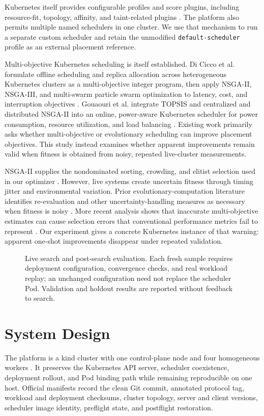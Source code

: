 \documentclass[conference]{IEEEtran}
\begin{document}
Kubernetes itself provides configurable profiles and score plugins, including resource-fit, topology, affinity, and taint-related plugins \cite{ref-k8s-config}. The platform also permits multiple named schedulers in one cluster. We use that mechanism to run a separate custom scheduler and retain the unmodified \texttt{default-scheduler} profile as an external placement reference.

Multi-objective Kubernetes scheduling is itself established. Di Cicco et al. formulate offline scheduling and replica allocation across heterogeneous Kubernetes clusters as a multi-objective integer program, then apply NSGA-II, NSGA-III, and multi-swarm particle swarm optimization to latency, cost, and interruption objectives \cite{ref-dicicco}. Gouaouri et al. integrate TOPSIS and centralized and distributed NSGA-II into an online, power-aware Kubernetes scheduler for power consumption, resource utilization, and load balancing \cite{ref-gouaouri}. Existing work primarily asks whether multi-objective or evolutionary scheduling can improve placement objectives. This study instead examines whether apparent improvements remain valid when fitness is obtained from noisy, repeated live-cluster measurements.

NSGA-II supplies the nondominated sorting, crowding, and elitist selection used in our optimizer \cite{ref-nsga2}. However, live systems create uncertain fitness through timing jitter and environmental variation. Prior evolutionary-computation literature identifies re-evaluation and other uncertainty-handling measures as necessary when fitness is noisy \cite{ref-noisy-ea}. More recent analysis shows that inaccurate multi-objective estimates can cause selection errors that conventional performance metrics fail to represent \cite{ref-noisy-moo-metrics}. Our experiment gives a concrete Kubernetes instance of that warning: apparent one-shot improvements disappear under repeated validation.

\begin{figure}[t]
\centering
\resizebox{0.93\textwidth}{!}{}
\caption{Live search and post-search evaluation. Each fresh sample requires deployment configuration, convergence checks, and real workload replay; an unchanged configuration need not replace the scheduler Pod. Validation and holdout results are reported without feedback to search.}
\label{fig:system-architecture}
\end{figure}

\section{System Design}
The platform is a kind cluster with one control-plane node and four homogeneous workers \cite{ref-kind}. It preserves the Kubernetes API server, scheduler coexistence, deployment rollout, and Pod binding path while remaining reproducible on one host. Official manifests record the clean Git commit, annotated protocol tag, workload and deployment checksums, cluster topology, server and client versions, scheduler image identity, preflight state, and postflight restoration.
\end{document}
